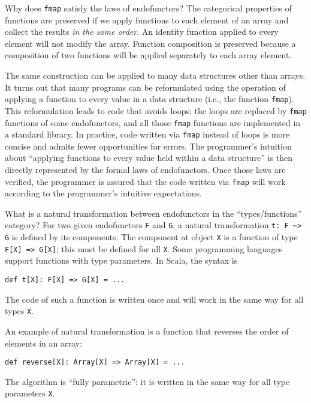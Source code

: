 Why does \lstinline!fmap! satisfy the laws of endofunctors? The categorical
properties of functions are preserved if we apply functions to each
element of an array and collect the results \emph{in the same order}.
An identity function applied to every element will not modify the
array. Function composition is preserved because a composition of
two functions will be applied separately to each array element.

The same construction can be applied to many data structures other
than arrays. It turns out that many programs can be reformulated using
the operation of applying a function to every value in a data structure
(i.e., the function \lstinline!fmap!). This reformulation leads to
code that avoids loops: the loops are replaced by \lstinline!fmap!
functions of some endofunctors, and all those \lstinline!fmap! functions
are implemented in a standard library. In practice, code written via
\lstinline!fmap! instead of loops is more concise and admits fewer
opportunities for errors. The programmer\textsf{'}s intuition about \textsf{``}applying
functions to every value held within a data structure\textsf{''} is then directly
represented by the formal laws of endofunctors. Once those laws are
verified, the programmer is assured that the code written via \lstinline!fmap!
will work according to the programmer\textsf{'}s intuitive expectations.


What is a natural transformation between endofunctors in the \textsf{``}types/functions\textsf{''}
category? For two given endofunctors \lstinline!F! and \lstinline!G!,
a natural transformation \lstinline!t: F ~> G! is defined by its
components. The component at object \lstinline!X! is a function of
type \lstinline!F[X] => G[X]!; this must be defined for all \lstinline!X!.
Some programming languages support functions with type parameters.
In Scala, the syntax is
\begin{lstlisting}
def t[X]: F[X] => G[X] = ...
\end{lstlisting}
The code of such a function is written once and will work in the same
way for all types \lstinline!X!.

An example of natural transformation is a function that reverses the
order of elements in an array:
\begin{lstlisting}
def reverse[X]: Array[X] => Array[X] = ...
\end{lstlisting}
The algorithm is \textsf{``}fully parametric\textsf{''}: it is written in the same
way for all type parameters \lstinline!X!.

